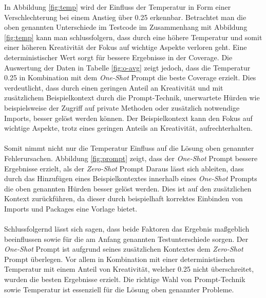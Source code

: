 In Abbildung \ref{fig:temp} wird der Einfluss der Temperatur in Form einer Verschlechterung bei einem Anstieg über 0.25 erkennbar. Betrachtet man die oben genannten Unterschiede im Testcode im Zusammenhang mit Abbildung \ref{fig:temp} kann man schlussfolgern, dass durch eine höhere Temperatur und somit einer höheren Kreativität der Fokus auf wichtige Aspekte verloren geht. Eine deterministischer Wert sorgt für bessere Ergebnisse in der Coverage. Die Auswertung der Daten in Tabelle \ref{fig:o-avg} zeigt jedoch, dass die Temperatur 0.25 in Kombination mit dem \textit{One-Shot} Prompt die beste Coverage erzielt. Dies verdeutlicht, dass durch einen geringen Anteil an Kreativität und mit zusätzlichem Beispielkontext durch die Prompt-Technik, unerwartete Hürden wie beispielsweise der Zugriff auf private Methoden oder zusätzlich notwendige Imports, besser gelöst werden können. Der Beispielkontext kann den Fokus auf wichtige Aspekte, trotz eines geringen Anteils an Kreativität, aufrechterhalten.\\\\
Somit nimmt nicht nur die Temperatur Einfluss auf die Lösung oben genannter Fehlerursachen. Abbildung \ref{fig:prompt} zeigt, dass der \textit{One-Shot} Prompt bessere Ergebnisse erzielt, als der \textit{Zero-Shot} Prompt Daraus lässt sich ableiten, dass durch das Hinzufügen eines Beispielkontextes innerhalb eines \textit{One-Shot} Prompts die oben genannten Hürden besser gelöst werden. Dies ist auf den zusätzlichen Kontext zurückführen, da dieser durch beispielhaft korrektes Einbinden von Imports und Packages eine Vorlage bietet.\\\\
Schlussfolgernd lässt sich sagen, dass beide Faktoren das Ergebnis maßgeblich beeinflussen sowie für die am Anfang genannten Testunterschiede sorgen. Der \textit{One-Shot} Prompt ist aufgrund seines zusätzlichen Kontextes dem \textit{Zero-Shot} Prompt überlegen. Vor allem in Kombination mit einer deterministischen Temperatur mit einem Anteil von Kreativität, welcher 0.25 nicht überschreitet, wurden die besten Ergebnisse erzielt. Die richtige Wahl von Prompt-Technik sowie Temperatur ist essenziell für die Lösung oben genannter Probleme.

